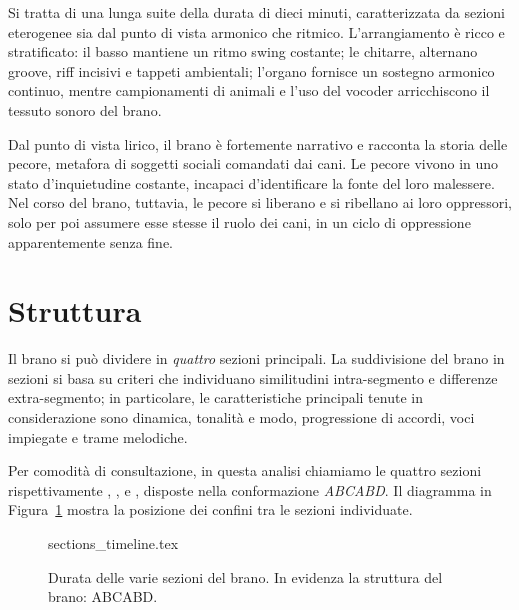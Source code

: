 \documentclass[class=book, crop=false, oneside, 12pt]{standalone}
\begin{document}
    Si tratta di una lunga suite della durata di dieci minuti, caratterizzata da sezioni eterogenee sia dal punto di vista armonico che ritmico. L'arrangiamento è ricco e stratificato: il basso 
    mantiene un ritmo swing costante; le chitarre, alternano groove, riff incisivi e tappeti ambientali; l'organo fornisce un sostegno armonico continuo, mentre campionamenti di animali e l'uso del vocoder arricchiscono il tessuto sonoro del brano.

    Dal punto di vista lirico, il brano è fortemente narrativo e racconta la storia delle pecore, metafora di soggetti sociali comandati dai cani. Le pecore vivono in uno stato d'inquietudine costante, incapaci d'identificare la fonte del loro malessere. Nel corso del brano, tuttavia, le pecore si liberano e si ribellano ai loro oppressori, solo per poi assumere esse stesse il ruolo dei cani, in un ciclo di oppressione apparentemente senza fine.

    \section{Struttura}
    \label{sec:04-struttura}

    Il brano si può dividere in \emph{quattro} sezioni principali.
    La suddivisione del brano in sezioni si basa su criteri che individuano similitudini intra-segmento e differenze extra-segmento; in particolare, le caratteristiche principali tenute in considerazione sono dinamica, tonalità e modo, progressione di accordi, voci impiegate e trame melodiche.

    Per comodità di consultazione, in questa analisi chiamiamo le quattro sezioni rispettivamente , ,  e , disposte nella conformazione \emph{ABCABD}. Il diagramma in Figura~\ref{fig:04-sections-timeline} mostra la posizione dei confini tra le sezioni individuate.

    \begin{figure}[htb]
        \centering
        {sections_timeline.tex}
        \caption[Durata delle varie sezioni del brano.]{Durata delle varie sezioni del brano. In evidenza la struttura del brano: ABCABD.}
        \label{fig:04-sections-timeline}
    \end{figure}
\end{document}
